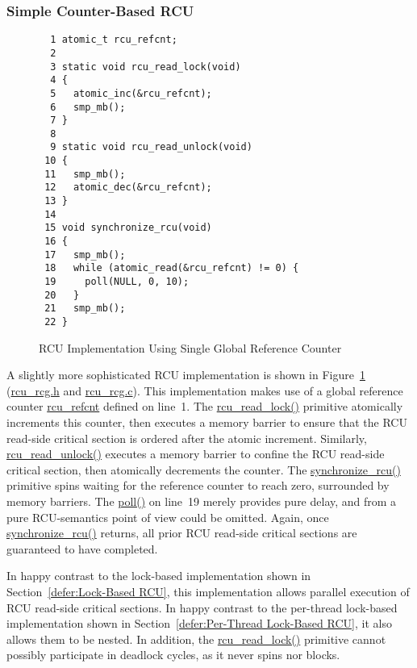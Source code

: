 \subsubsection{Simple Counter-Based RCU}
\label{defer:Simple Counter-Based RCU}

\begin{figure}[tbp]
{ \scriptsize
\begin{verbatim}
  1 atomic_t rcu_refcnt;
  2 
  3 static void rcu_read_lock(void)
  4 {
  5   atomic_inc(&rcu_refcnt);
  6   smp_mb();
  7 }
  8 
  9 static void rcu_read_unlock(void)
 10 {
 11   smp_mb();
 12   atomic_dec(&rcu_refcnt);
 13 }
 14 
 15 void synchronize_rcu(void)
 16 {
 17   smp_mb();
 18   while (atomic_read(&rcu_refcnt) != 0) {
 19     poll(NULL, 0, 10);
 20   }
 21   smp_mb();
 22 }
\end{verbatim}
}
\caption{RCU Implementation Using Single Global Reference Counter}
\label{fig:defer:RCU Implementation Using Single Global Reference Counter}
\end{figure}

A slightly more sophisticated RCU implementation is shown in
Figure~\ref{fig:defer:RCU Implementation Using Single Global Reference Counter}
(\url{rcu_rcg.h} and \url{rcu_rcg.c}).
This implementation makes use of a global reference counter
\url{rcu_refcnt} defined on line~1.
The \url{rcu_read_lock()} primitive atomically increments this
counter, then executes a memory barrier to ensure that the
RCU read-side critical section is ordered after the atomic
increment.
Similarly, \url{rcu_read_unlock()} executes a memory barrier to
confine the RCU read-side critical section, then atomically
decrements the counter.
The \url{synchronize_rcu()} primitive spins waiting for the reference
counter to reach zero, surrounded by memory barriers.
The \url{poll()} on line~19 merely provides pure delay, and from
a pure RCU-semantics point of view could be omitted.
Again, once \url{synchronize_rcu()} returns, all prior
RCU read-side critical sections are guaranteed to have completed.

In happy contrast to the lock-based implementation shown in
Section~\ref{defer:Lock-Based RCU}, this implementation
allows parallel execution of RCU read-side critical sections.
In happy contrast to the per-thread lock-based implementation shown in
Section~\ref{defer:Per-Thread Lock-Based RCU},
it also allows them to be nested.
In addition, the \url{rcu_read_lock()} primitive cannot possibly
participate in deadlock cycles, as it never spins nor blocks.

